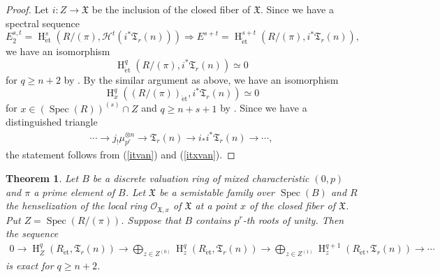 \documentclass{article}
\newtheorem{thm}{\indent \sc Theorem}[section]
\newcommand{\spec}{\operatorname{Spec}}
\newcommand{\et}{\mathrm{\acute{e}t}}
\newcommand{\HO}{\operatorname{H}}
\begin{document}
%
\begin{proof}\upshape
Let $i: Z\to \mathfrak{X}$ be the inclusion of
the closed fiber of $\mathfrak{X}$.
Since we have a spectral sequence
%
\begin{equation*}
E_{2}^{s, t}
=
\HO_{\et}^{s}(
R/(\pi), \mathcal{H}^{t}(i^{*}\mathfrak{T}_{r}(n))
)
\Rightarrow
E^{s+t}
=
\HO^{s+t}_{\et}(
R/(\pi), i^{*}\mathfrak{T}_{r}(n)
),
\end{equation*}
%
we have an isomorphism
%
\begin{equation}\label{itvan}
\HO_{\et}^{q}(R/(\pi), i^{*}\mathfrak{T}_{r}(n))  
\simeq  
0
\end{equation}
%
for $q\geq n+2$
by \cite[Expos\'{e} X, Th\'{e}or\`{e}me 5.1]{SGA4}.
By the similar argument as above,
we have an isomorphism
%
\begin{equation}\label{itxvan}
\HO^{q}_{x}\left(
(R/(\pi))_{\et},
i^{*}\mathfrak{T}_{r}(n)
\right)
\simeq 0
\end{equation}
%
for $x\in (\spec(R))^{(s)}\cap Z$
and $q\geq n+s+1$ by
\cite[Proposition 2.6]{Sak4}.
Since we have a distinguished triangle
%
\begin{align*}
\cdots\to  
j_{!}\mu_{p^{r}}^{\otimes n}
\to \mathfrak{T}_{r}(n)
\to
i_{*}i^{*}\mathfrak{T}_{r}(n)
\to\cdots,
\end{align*}
%
the statement follows from
(\ref{itvan}) and (\ref{itxvan}).
\end{proof}
%

%
\begin{thm}\upshape\label{RelGer}
Let $B$ be a discrete valuation ring of mixed characteristic $(0, p)$
and $\pi$ a prime element of $B$. Let $\mathfrak{X}$ be a semistable
family over $\spec(B)$ and $R$ the henselization of the local ring $\mathcal{O}_{\mathfrak{X}, x}$ of 
$\mathfrak{X}$ at a 
point $x$ of the closed fiber of $\mathfrak{X}$.
Put $Z=\spec(R/(\pi))$.
Suppose that $B$ contains $p^{r}$-th roots of unity.
Then the sequence
%
\begin{align*}
0\to 
\HO_{Z}^{q}(R_{\et}, \mathfrak{T}_{r}(n))
\to
\displaystyle\bigoplus_{z\in Z^{(0)}}
\HO_{z}^{q}(R_{\et}, \mathfrak{T}_{r}(n))
\to
\displaystyle\bigoplus_{z\in Z^{(1)}}
\HO_{z}^{q+1}(R_{\et}, \mathfrak{T}_{r}(n))
\to
\cdots
\end{align*}
%
is exact for $q\geq n+2$.
\end{thm}
%
\end{document}
